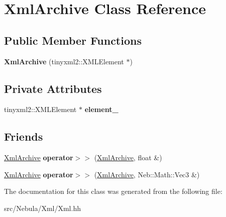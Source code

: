 \hypertarget{classXmlArchive}{\section{\-Xml\-Archive \-Class \-Reference}
\label{classXmlArchive}
}
\subsection*{\-Public \-Member \-Functions}
\begin{DoxyCompactItemize}
\item 
\hypertarget{classXmlArchive_af60507762c0e126c686ba370b502c519}{{\bfseries \-Xml\-Archive} (tinyxml2\-::\-X\-M\-L\-Element $\ast$)}\label{classXmlArchive_af60507762c0e126c686ba370b502c519}

\end{DoxyCompactItemize}
\subsection*{\-Private \-Attributes}
\begin{DoxyCompactItemize}
\item 
\hypertarget{classXmlArchive_a9cc9a554d9a42141a9f51bf9cfa9eca5}{tinyxml2\-::\-X\-M\-L\-Element $\ast$ {\bfseries element\-\_\-}}\label{classXmlArchive_a9cc9a554d9a42141a9f51bf9cfa9eca5}

\end{DoxyCompactItemize}
\subsection*{\-Friends}
\begin{DoxyCompactItemize}
\item 
\hypertarget{classXmlArchive_ac00483f1bd65b3d880d13399bdf383a1}{\hyperlink{classXmlArchive}{\-Xml\-Archive} {\bfseries operator$>$$>$} (\hyperlink{classXmlArchive}{\-Xml\-Archive}, float \&)}\label{classXmlArchive_ac00483f1bd65b3d880d13399bdf383a1}

\item 
\hypertarget{classXmlArchive_ada2eb5f73207ee6133a5f6876c0bbe79}{\hyperlink{classXmlArchive}{\-Xml\-Archive} {\bfseries operator$>$$>$} (\hyperlink{classXmlArchive}{\-Xml\-Archive}, \-Neb\-::\-Math\-::\-Vec3 \&)}\label{classXmlArchive_ada2eb5f73207ee6133a5f6876c0bbe79}

\end{DoxyCompactItemize}


\-The documentation for this class was generated from the following file\-:\begin{DoxyCompactItemize}
\item 
src/\-Nebula/\-Xml/\-Xml.\-hh\end{DoxyCompactItemize}
